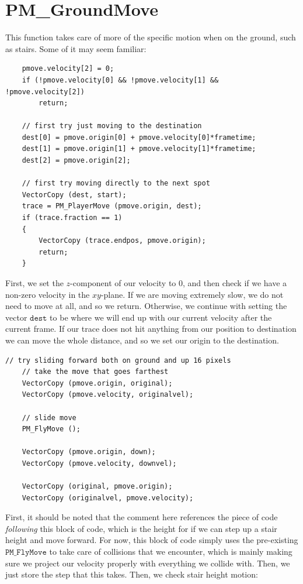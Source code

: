 \documentclass{article}
\begin{document}
\section{PM\_GroundMove}
This function takes care of more of the specific motion when on the ground, such as stairs. Some of it may seem familiar: 
\begin{verbatim}
	pmove.velocity[2] = 0;
	if (!pmove.velocity[0] && !pmove.velocity[1] && !pmove.velocity[2])
		return;

	// first try just moving to the destination	
	dest[0] = pmove.origin[0] + pmove.velocity[0]*frametime;
	dest[1] = pmove.origin[1] + pmove.velocity[1]*frametime;	
	dest[2] = pmove.origin[2];

	// first try moving directly to the next spot
	VectorCopy (dest, start);
	trace = PM_PlayerMove (pmove.origin, dest);
	if (trace.fraction == 1)
	{
		VectorCopy (trace.endpos, pmove.origin);
		return;
	}
\end{verbatim}
First, we set the $z$-component of our velocity to 0, and then check if we have a non-zero velocity in the $xy$-plane. If we are moving extremely slow, we do not need to move at all, and so we return. Otherwise, we continue with setting the vector $\texttt{dest}$ to be where we will end up with our current velocity after the current frame. If our trace does not hit anything from our position to destination we can move the whole distance, and so we set our origin to the destination. 
\begin{verbatim}
// try sliding forward both on ground and up 16 pixels
	// take the move that goes farthest
	VectorCopy (pmove.origin, original);
	VectorCopy (pmove.velocity, originalvel);

	// slide move
	PM_FlyMove ();

	VectorCopy (pmove.origin, down);
	VectorCopy (pmove.velocity, downvel);

	VectorCopy (original, pmove.origin);
	VectorCopy (originalvel, pmove.velocity);
\end{verbatim}
First, it should be noted that the comment here references the piece of code \textit{following} this block of code, which is the height for if we can step up a stair height and move forward. For now, this block of code simply uses the pre-existing $\texttt{PM\_FlyMove}$ to take care of collisions that we encounter, which is mainly making sure we project our velocity properly with everything we collide with. Then, we just store the step that this takes. Then, we check stair height motion:
\end{document}
